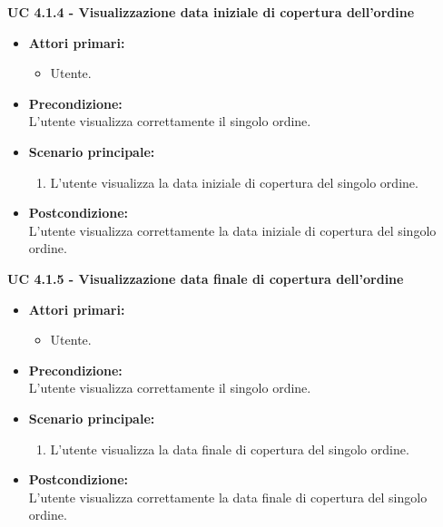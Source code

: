 \vspace{0.5cm}

\noindent \textbf{\large UC 4.1.4 - Visualizzazione data iniziale di copertura dell'ordine}
\label{uc:visualizzazione-data-iniziale-copertura}
\begin{itemize}

	\item \textbf{Attori primari: }
		\begin{itemize}
			\item Utente.
		\end{itemize}

	\item \textbf{Precondizione: }\\[0.3cm]
		L'utente visualizza correttamente il singolo ordine.

	\item \textbf{Scenario principale: }
		\begin{enumerate}
			\item L'utente visualizza la data iniziale di copertura del singolo ordine.
		\end{enumerate}
		

	\item \textbf{Postcondizione: }\\[0.3cm]
		L'utente visualizza correttamente la data iniziale di copertura del singolo ordine.

\end{itemize}

\vspace{0.5cm}

\noindent \textbf{\large UC 4.1.5 - Visualizzazione data finale di copertura dell'ordine}
\label{uc:visualizzazione-data-finale-copertura}
\begin{itemize}

	\item \textbf{Attori primari: }
		\begin{itemize}
			\item Utente.
		\end{itemize}

	\item \textbf{Precondizione: }\\[0.3cm]
		L'utente visualizza correttamente il singolo ordine.

	\item \textbf{Scenario principale: }
		\begin{enumerate}
			\item L'utente visualizza la data finale di copertura del singolo ordine.
		\end{enumerate}
		

	\item \textbf{Postcondizione: }\\[0.3cm]
		L'utente visualizza correttamente la data finale di copertura del singolo ordine.

\end{itemize}

